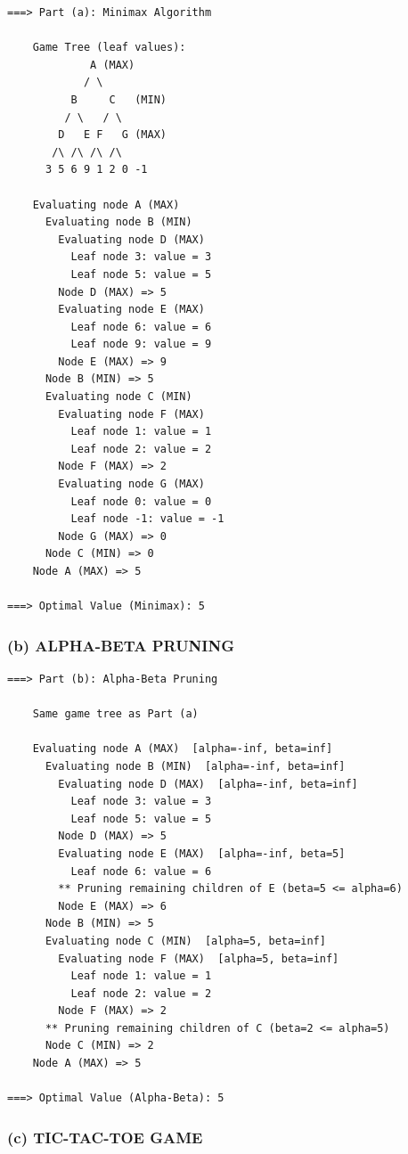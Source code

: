 \documentclass[12pt,a4paper]{article}
\begin{document}
\begin{lstlisting}[style=outputstyle]
===> Part (a): Minimax Algorithm

    Game Tree (leaf values):
             A (MAX)
            / \
          B     C   (MIN)
         / \   / \
        D   E F   G (MAX)
       /\ /\ /\ /\
      3 5 6 9 1 2 0 -1

    Evaluating node A (MAX)
      Evaluating node B (MIN)
        Evaluating node D (MAX)
          Leaf node 3: value = 3
          Leaf node 5: value = 5
        Node D (MAX) => 5
        Evaluating node E (MAX)
          Leaf node 6: value = 6
          Leaf node 9: value = 9
        Node E (MAX) => 9
      Node B (MIN) => 5
      Evaluating node C (MIN)
        Evaluating node F (MAX)
          Leaf node 1: value = 1
          Leaf node 2: value = 2
        Node F (MAX) => 2
        Evaluating node G (MAX)
          Leaf node 0: value = 0
          Leaf node -1: value = -1
        Node G (MAX) => 0
      Node C (MIN) => 0
    Node A (MAX) => 5

===> Optimal Value (Minimax): 5
\end{lstlisting}

\subsubsection*{(b) ALPHA-BETA PRUNING}

\begin{lstlisting}[style=outputstyle]
===> Part (b): Alpha-Beta Pruning

    Same game tree as Part (a)

    Evaluating node A (MAX)  [alpha=-inf, beta=inf]
      Evaluating node B (MIN)  [alpha=-inf, beta=inf]
        Evaluating node D (MAX)  [alpha=-inf, beta=inf]
          Leaf node 3: value = 3
          Leaf node 5: value = 5
        Node D (MAX) => 5
        Evaluating node E (MAX)  [alpha=-inf, beta=5]
          Leaf node 6: value = 6
        ** Pruning remaining children of E (beta=5 <= alpha=6)
        Node E (MAX) => 6
      Node B (MIN) => 5
      Evaluating node C (MIN)  [alpha=5, beta=inf]
        Evaluating node F (MAX)  [alpha=5, beta=inf]
          Leaf node 1: value = 1
          Leaf node 2: value = 2
        Node F (MAX) => 2
      ** Pruning remaining children of C (beta=2 <= alpha=5)
      Node C (MIN) => 2
    Node A (MAX) => 5

===> Optimal Value (Alpha-Beta): 5
\end{lstlisting}

\subsubsection*{(c) TIC-TAC-TOE GAME}
\end{document}
